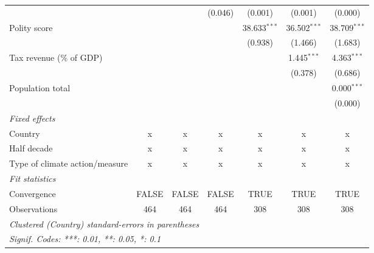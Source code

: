 \begin{tabular}{lcccccc}
                                                               &                   &                & (0.046)           & (0.001)          & (0.001)          & (0.000)\\   
   Polity score                                                &                   &                &                   & 38.633$^{***}$   & 36.502$^{***}$   & 38.709$^{***}$\\   
                                                               &                   &                &                   & (0.938)          & (1.466)          & (1.683)\\   
   Tax revenue (\% of GDP)                                     &                   &                &                   &                  & 1.445$^{***}$    & 4.363$^{***}$\\   
                                                               &                   &                &                   &                  & (0.378)          & (0.686)\\   
   Population total                                            &                   &                &                   &                  &                  & 0.000$^{***}$\\   
                                                               &                   &                &                   &                  &                  & (0.000)\\   
   \emph{Fixed effects}\\
   Country                                                     & x                 & x              & x                 & x                & x                & x\\  
   Half decade                                                 & x                 & x              & x                 & x                & x                & x\\  
   Type of climate action/measure                              & x                 & x              & x                 & x                & x                & x\\  
   \midrule \emph{Fit statistics}\\
   Convergence                                                 &FALSE              & FALSE          & FALSE             & TRUE             & TRUE             & TRUE\\  
   Observations                                                & 464               & 464            & 464               & 308              & 308              & 308\\  
   \midrule
   \multicolumn{7}{l}{\emph{Clustered (Country) standard-errors in parentheses}}\\
   \multicolumn{7}{l}{\emph{Signif. Codes: ***: 0.01, **: 0.05, *: 0.1}}\\
\end{tabular}
\par\endgroup


